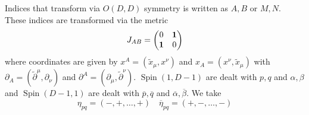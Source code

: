 \vspace{2ex}
\begin{defi}
Indices that transform via $O(D,D)$ symmetry is written as $A,B$ or $M,N$. These indices are transformed via the metric
\[J_{AB}=\begin{pmatrix}
0&{\bf 1}\\{\bf 1}&0
\end{pmatrix}
\]
where coordinates are given by $x^{A}=(\tilde{x}_{\mu },x^{\nu })$ and $x_{A}=(x^{\nu },\tilde{x}_{\mu })$  with $\partial _{A}=(\tilde{\partial }^{\mu },\partial _{\nu })$ and $\partial ^{A}=(\partial _{\mu },\tilde{\partial }^{\nu })$. $\mathop{\mathrm{Spin}}(1,D-1)$ are dealt with $p,q$ and $\alpha ,\beta $ and $\mathop{\mathrm{Spin}}(D-1,1)$ are dealt with $\overline{p},\overline{q}$ and $\overline{\alpha },\overline{\beta }$. We take
\[\eta _{pq}=(-,+,\ldots,+)\quad \overline{\eta }_{pq}=(+,-,\ldots ,-)\]

\end{defi}
\vspace{2ex}


